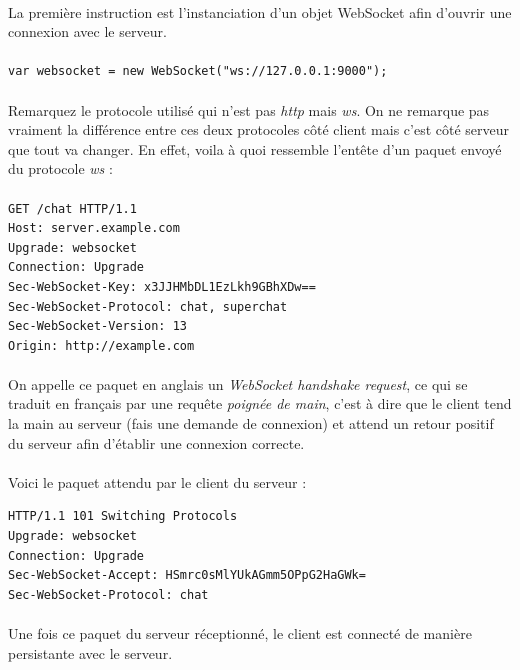 \documentclass[a4paper,12pt]{report}
\begin{document}
	\paragraph*{}
	La première instruction est l'instanciation d'un objet WebSocket afin d'ouvrir une connexion avec le serveur.
	\paragraph*{}
	\begin{lstlisting}
var websocket = new WebSocket("ws://127.0.0.1:9000");
	\end{lstlisting}
	\paragraph*{}
	Remarquez le protocole utilisé qui n'est pas \emph{http} mais \emph{ws}. 
	On ne remarque pas vraiment la différence entre ces deux protocoles côté client mais c'est côté serveur que tout va changer.
	En effet, voila à quoi ressemble l'entête d'un paquet envoyé du protocole \emph{ws} :
	\paragraph*{}
	\begin{lstlisting}
GET /chat HTTP/1.1
Host: server.example.com
Upgrade: websocket
Connection: Upgrade
Sec-WebSocket-Key: x3JJHMbDL1EzLkh9GBhXDw==
Sec-WebSocket-Protocol: chat, superchat
Sec-WebSocket-Version: 13
Origin: http://example.com
	\end{lstlisting}
	\paragraph*{}
	On appelle ce paquet en anglais un \emph{WebSocket handshake request}, ce qui se traduit en français par une requête \emph{poignée de main}, c'est à dire que le client tend la main au serveur (fais une demande de connexion) et attend un retour positif du serveur afin d'établir une connexion correcte.
	\paragraph*{}
	Voici le paquet attendu par le client du serveur :
	\begin{lstlisting}
HTTP/1.1 101 Switching Protocols
Upgrade: websocket
Connection: Upgrade
Sec-WebSocket-Accept: HSmrc0sMlYUkAGmm5OPpG2HaGWk=
Sec-WebSocket-Protocol: chat
	\end{lstlisting}	
	\paragraph*{}
	Une fois ce paquet du serveur réceptionné, le client est connecté de manière persistante avec le serveur.
\end{document}
